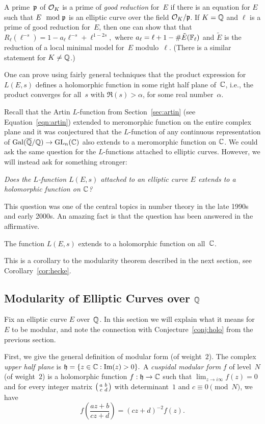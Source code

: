 A prime~$\mathfrak{p}$ of $\mathcal{O}_K$ is a prime of \emph{good reduction} for~$E$ if
there is an equation for $E$ such that $E \mod {\mathfrak{p}}$ is an elliptic
curve over the field $\mathcal{O}_K/\mathfrak{p}$. If $K=\mathbb{Q}$ and $\ell$ is a prime of
good reduction for~$E$, then one can show that that
$R_{\ell}(\ell^{-s}) = 1 - a_\ell \ell^{-s} + \ell^{1-2s},$
where
$
  a_{\ell} = \ell + 1 - \#\tilde{E}(\mathbb{F}_\ell)
$
and $\tilde{E}$ is the reduction of a local minimal
model for~$E$ modulo~$\ell$.  (There is a similar statement
for $K\neq \mathbb{Q}$.)

One can prove using fairly general techniques that the product
expression for $L(E,s)$ defines a holomorphic function in some right
half plane of~$\mathbb{C}$, i.e., the product converges for all~$s$ with
$\Re(s)>\alpha$, for some real number~$\alpha$.

Recall that the Artin $L$-function from Section~\ref{sec:artin}
(see Equation~\ref{eqn:artin}) extended to meromorphic function
on the entire complex plane and it was conjectured that the $L$-function
of any continuous representation of $\operatorname{Gal}(\overline{\mathbb{Q}}/\mathbb{Q}) \to \operatorname{GL}_n(\mathbb{C})$ also
extends to a meromorphic function on $\mathbb{C}$. We could ask the same
question for the $L$-functions attached to elliptic curves. However,
we will instead ask for something stronger:
\begin{center}
\emph{Does the $L$-function $L(E,s)$ attached to an
elliptic curve $E$ extends to a holomorphic function on $\mathbb{C}$?}
\end{center}
This question was one of the central topics
in number theory in the late 1990s and early 2000s.
An amazing fact is that the question has been answered
in the affirmative.
\begin{theorem}\label{conj:holo}
The function $L(E,s)$ extends to a holomorphic
function on all~$\mathbb{C}$.
\end{theorem}
This is a corollary to the modularity theorem described
in the next section, see Corollary~\ref{cor:hecke}.


\subsection{Modularity of Elliptic Curves over $\mathbb{Q}$}
Fix an elliptic curve $E$ over~$\mathbb{Q}$.  In this section we will explain
what it means for $E$ to be modular, and note the connection with
Conjecture~\ref{conj:holo} from the previous section.

First, we give the general definition of modular form (of weight~$2$).
The complex {\em upper half plane} is
$
  \mathfrak{h}  = \{z  \in \mathbb{C} : \text{Im}(z) > 0\}.
$
A {\em cuspidal modular form} $f$ of level~$N$ (of weight~$2$) is a holomorphic
function
$
   f : \mathfrak{h} \to \mathbb{C}
$
such that $\lim_{z\to i\infty} f(z) = 0$ and for every integer matrix
$\left( \begin{smallmatrix}a&b\\c&d\end{smallmatrix}\right)$ with determinant~$1$ and $c\equiv 0 \pmod{N}$, we have
$$
  f\left( \frac{az + b}{cz + d} \right)
         = (cz+d)^{-2} f(z).
$$

